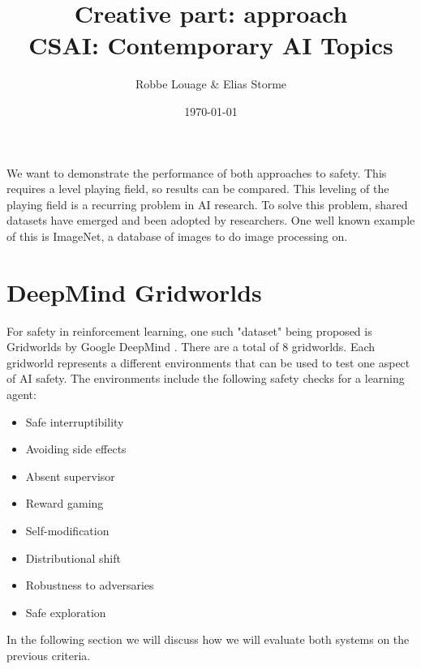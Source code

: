 \documentclass[a4paper,kul]{kulakarticle}
\begin{document}
\title{}
\title{Creative part: approach\\CSAI: Contemporary AI Topics}
\author{Robbe Louage \& Elias Storme}
\date{\today}
\maketitle
\vspace{1.5em}

We want to demonstrate the performance of both approaches to safety. This requires a level 
playing field, so results can be compared. This leveling of the playing field is a recurring 
problem in AI research. To solve this problem, shared datasets have emerged and been adopted by researchers. One well known example of this is ImageNet, a database of images to do image processing on.
\section{DeepMind Gridworlds}
For safety in reinforcement learning, one such "dataset" being proposed is 
Gridworlds by Google DeepMind \cite{leike2017ai}. There are a total of 8 
gridworlds. Each gridworld represents a different environments that can be used to test one aspect of AI safety.
The environments include the following safety checks for a learning agent: 
\begin{multicols}{2}
\begin{itemize}
	\setlength\itemsep{0.25em}
	\item Safe interruptibility
	\item Avoiding side effects
	\item Absent supervisor
	\item Reward gaming
	\item Self-modification
	\item Distributional shift
	\item Robustness to adversaries
	\item Safe exploration
\end{itemize}
\end{multicols}
In the following section we will discuss how we will evaluate both systems on 
the previous criteria.
\end{document}
